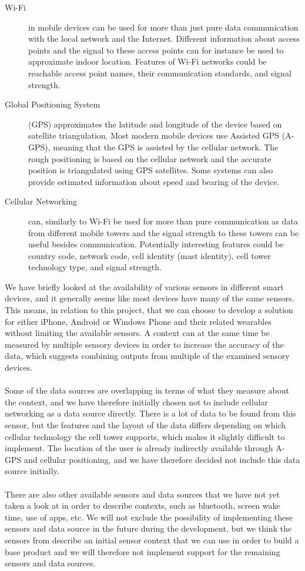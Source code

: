 \begin{description}
    \item[Wi-Fi] in mobile devices can be used for more than just pure data communication with the local network and the Internet. Different information about access points and the signal to these access points can for instance be used to approximate indoor location. Features of Wi-Fi networks could be reachable access point names, their communication standards, and signal strength. 
    \item[Global Positioning System] (GPS) approximates the latitude and longitude of the device based on satellite triangulation. Most modern mobile devices use Assisted GPS (A-GPS), meaning that the GPS is assisted by the cellular network. The rough positioning is based on the cellular network and the accurate position is triangulated using GPS satellites. Some systems can also provide estimated information about speed and bearing of the device.
    \item[Cellular Networking] can, similarly to Wi-Fi be used for more than pure communication as data from different mobile towers and the signal strength to these towers can be useful besides communication. Potentially interesting features could be country code, network code, cell identity (mast identity), cell tower technology type, and signal strength.
\end{description}

We have briefly looked at the availability of various sensors in different smart devices, and it generally seems like most devices have many of the same sensors. This means, in relation to this project, that we can choose to develop a solution for either iPhone, Android or Windows Phone and their related wearables without limiting the available sensors. A context can at the same time be measured by multiple sensory devices in order to increase the accuracy of the data, which suggests combining outputs from multiple of the examined sensory devices. 
\\\\
Some of the data sources are overlapping in terms of what they measure about the context, and we have therefore initially chosen not to include cellular networking as a data source directly. There is a lot of data to be found from this sensor, but the features and the layout of the data differs depending on which cellular technology the cell tower supports, which makes it slightly difficult to implement. The location of the user is already indirectly available through A-GPS and cellular positioning, and we have therefore decided not include this data source initially. 
\\\\
There are also other available sensors and data sources that we have not yet taken a look at in order to describe contexts, such as bluetooth, screen wake time, use of apps, etc. We will not exclude the possibility of implementing these sensors and data source in the future during the development, but we think the sensors from  describe an initial sensor context that we can use in order to build a base product and we will therefore not implement support for the remaining sensors and data sources.  